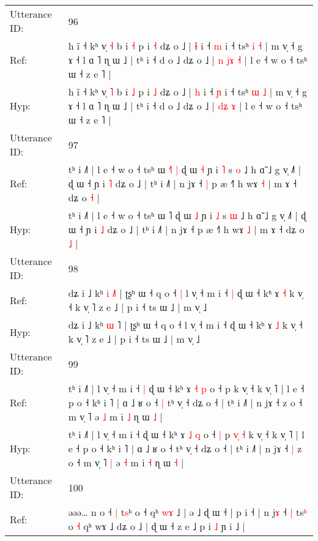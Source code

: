 \documentclass[10pt]{article}
\DeclareRobustCommand{\hl}[1]{{\textcolor{red}{#1}}}
\begin{document}
\begin{longtable}{ll}
 \\
\midrule
Utterance ID: & 96 \\
Ref: & h ĩ ˧ kʰ v̩ \hl{˧} b i \hl{˧} p i \hl{˧} dʑ o ˩ | \hl{ɬ} i ˧ \hl{m} i ˧ tsʰ \hl{i} \hl{˧} | m v̩ ˧ g ɤ ˧ l ɑ ˥ ɳ ɯ ˩ | tʰ i ˧ d o ˩ dʑ o ˩ |\hl{ }\hl{n} \hl{j}\hl{ɤ} \hl{˧} | l e ˧ w o ˧ tsʰ ɯ ˧ z e ˥ |
 \\
Hyp: & h ĩ ˧ kʰ v̩ \hl{˥} b i \hl{˩} p i \hl{˩} dʑ o ˩ | \hl{h} i ˧ \hl{ɲ} i ˧ tsʰ \hl{ɯ} \hl{˩} | m v̩ ˧ g ɤ ˧ l ɑ ˥ ɳ ɯ ˩ | tʰ i ˧ d o ˩ dʑ o ˩ |\hl{}\hl{} \hl{d}\hl{ʑ} \hl{ɤ} | l e ˧ w o ˧ tsʰ ɯ ˧ z e ˥ |
 \\
\midrule
Utterance ID: & 97 \\
Ref: & tʰ i ˩˥ | l e ˧ w o ˧ tsʰ ɯ \hl{˧}˥\hl{ }\hl{|} ɖ ɯ \hl{˧} ɲ i \hl{˥} s \hl{o} ˩ h ɑ̃ ˩ g v̩ ˩˥ | ɖ ɯ ˧ ɲ i \hl{˥} dʑ o ˩ | tʰ i ˩˥ | n jɤ ˧\hl{ }\hl{|} p æ ˧˥ h wɤ \hl{˧} | m ɤ ˧ dʑ o \hl{˧} |
 \\
Hyp: & tʰ i ˩˥ | l e ˧ w o ˧ tsʰ ɯ \hl{}˥\hl{}\hl{} ɖ ɯ \hl{˩} ɲ i \hl{˩} s \hl{ɯ} ˩ h ɑ̃ ˩ g v̩ ˩˥ | ɖ ɯ ˧ ɲ i \hl{˩} dʑ o ˩ | tʰ i ˩˥ | n jɤ ˧\hl{}\hl{} p æ ˧˥ h wɤ \hl{˩} | m ɤ ˧ dʑ o \hl{˩} |
 \\
\midrule
Utterance ID: & 98 \\
Ref: & dʑ i ˩ kʰ \hl{i} \hl{˩}˥ | ʈʂʰ ɯ ˧ q o ˧\hl{ }\hl{|} l v̩ ˧ m i ˧\hl{ }\hl{|} ɖ ɯ ˧ kʰ ɤ \hl{˧} k v̩ ˧ k v̩ ˥ z e ˩ | p i ˧ ts ɯ ˩ | m v̩ ˩
 \\
Hyp: & dʑ i ˩ kʰ \hl{ɯ} \hl{}˥ | ʈʂʰ ɯ ˧ q o ˧\hl{}\hl{} l v̩ ˧ m i ˧\hl{}\hl{} ɖ ɯ ˧ kʰ ɤ \hl{˩} k v̩ ˧ k v̩ ˥ z e ˩ | p i ˧ ts ɯ ˩ | m v̩ ˩
 \\
\midrule
Utterance ID: & 99 \\
Ref: & tʰ i ˩˥ | l v̩ ˧ m i ˧\hl{ }\hl{|} ɖ ɯ ˧ kʰ ɤ \hl{˧} \hl{p} o ˧\hl{}\hl{} p\hl{}\hl{}\hl{}\hl{}\hl{} k v̩ ˧ k v̩ ˥ | l e ˧ p o ˧ kʰ i ˥ | ɑ ˩ ʁ o ˧\hl{ }\hl{|} tʰ v̩ ˧ dʑ o ˧ | tʰ i ˩˥ | n jɤ ˧\hl{}\hl{} z o ˧ m v̩ ˥\hl{}\hl{} ə \hl{˩} m i \hl{˩} ɳ ɯ \hl{˩} |
 \\
Hyp: & tʰ i ˩˥ | l v̩ ˧ m i ˧\hl{}\hl{} ɖ ɯ ˧ kʰ ɤ \hl{˩} \hl{q} o ˧\hl{ }\hl{|} p\hl{ }\hl{v}\hl{̩}\hl{ }\hl{˧} k v̩ ˧ k v̩ ˥ | l e ˧ p o ˧ kʰ i ˥ | ɑ ˩ ʁ o ˧\hl{}\hl{} tʰ v̩ ˧ dʑ o ˧ | tʰ i ˩˥ | n jɤ ˧\hl{ }\hl{|} z o ˧ m v̩ ˥\hl{ }\hl{|} ə \hl{˧} m i \hl{˧} ɳ ɯ \hl{˧} |
 \\
\midrule
Utterance ID: & 100 \\
Ref: & əəə… n o ˧\hl{ }\hl{|} t\hl{s}ʰ o ˧ qʰ \hl{w}\hl{ɤ} ˩ | ə ˩ ɖ\hl{} ɯ ˧ | p i ˧\hl{}\hl{}\hl{}\hl{}\hl{}\hl{} | n j\hl{ɤ} ˧\hl{ }\hl{|} ts\hl{ʰ} o \hl{˧} qʰ wɤ ˩ dʑ o ˩ | ɖ ɯ ˧ z e ˩\hl{}\hl{} p i \hl{˩} ɲ i ˩ |

\end{longtable}
\end{document}
